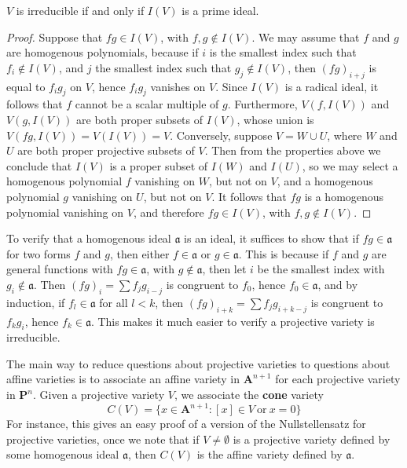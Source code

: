 \begin{theorem}
    $V$ is irreducible if and only if $I(V)$ is a prime ideal.
\end{theorem}
\begin{proof}
    Suppose that $fg \in I(V)$, with $f,g \not \in I(V)$. We may assume that $f$ and $g$ are homogenous polynomials, because if $i$ is the smallest index such that $f_i \not \in I(V)$, and $j$ the smallest index such that $g_j \not \in I(V)$, then $(fg)_{i + j}$ is equal to $f_ig_j$ on $V$, hence $f_ig_j$ vanishes on $V$. Since $I(V)$ is a radical ideal, it follows that $f$ cannot be a scalar multiple of $g$. Furthermore, $V(f,I(V))$ and $V(g,I(V))$ are both proper subsets of $I(V)$, whose union is $V(fg,I(V)) = V(I(V)) = V$. Conversely, suppose $V = W \cup U$, where $W$ and $U$ are both proper projective subsets of $V$. Then from the properties above we conclude that $I(V)$ is a proper subset of $I(W)$ and $I(U)$, so we may select a homogenous polynomial $f$ vanishing on $W$, but not on $V$, and a homogenous polynomial $g$ vanishing on $U$, but not on $V$. It follows that $fg$ is a homogenous polynomial vanishing on $V$, and therefore $fg \in I(V)$, with $f,g \not \in I(V)$.
\end{proof}

To verify that a homogenous ideal $\mathfrak{a}$ is an ideal, it suffices to show that if $fg \in \mathfrak{a}$ for two forms $f$ and $g$, then either $f \in \mathfrak{a}$ or $g \in \mathfrak{a}$. This is because if $f$ and $g$ are general functions with $fg \in \mathfrak{a}$, with $g \not \in \mathfrak{a}$, then let $i$ be the smallest index with $g_i \not \in \mathfrak{a}$. Then $(fg)_i = \sum f_jg_{i-j}$ is congruent to $f_0$, hence $f_0 \in \mathfrak{a}$, and by induction, if $f_l \in \mathfrak{a}$ for all $l < k$, then $(fg)_{i+k} = \sum f_jg_{i+k-j}$ is congruent to $f_kg_i$, hence $f_k \in \mathfrak{a}$. This makes it much easier to verify a projective variety is irreducible.

The main way to reduce questions about projective varieties to questions about affine varieties is to associate an affine variety in $\mathbf{A}^{n+1}$ for each projective variety in $\mathbf{P}^n$. Given a projective variety $V$, we associate the {\bf cone} variety
%
\[ C(V) = \{ x \in \mathbf{A}^{n+1}: [x] \in V\ \text{or}\ x = 0 \} \]
%
For instance, this gives an easy proof of a version of the Nullstellensatz for projective varieties, once we note that if $V \neq \emptyset$ is a projective variety defined by some homogenous ideal $\mathfrak{a}$, then $C(V)$ is the affine variety defined by $\mathfrak{a}$.

